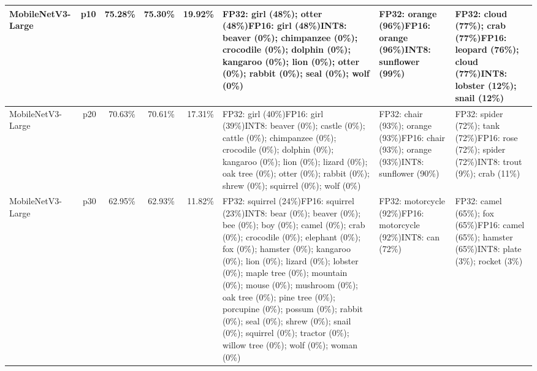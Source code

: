 \begin{longtable}{p{2.8cm} r r r r p{5.0cm} p{4.2cm} p{4.2cm}}
MobileNetV3-Large & p10 & 75.28\% & 75.30\% & 19.92\% & FP32: girl (48\%); otter (48\%)\newline FP16: girl (48\%)\newline INT8: beaver (0\%); chimpanzee (0\%); crocodile (0\%); dolphin (0\%); kangaroo (0\%); lion (0\%); otter (0\%); rabbit (0\%); seal (0\%); wolf (0\%) & FP32: orange (96\%)\newline FP16: orange (96\%)\newline INT8: sunflower (99\%) & FP32: cloud (77\%); crab (77\%)\newline FP16: leopard (76\%); cloud (77\%)\newline INT8: lobster (12\%); snail (12\%) \\ \hline
MobileNetV3-Large & p20 & 70.63\% & 70.61\% & 17.31\% & FP32: girl (40\%)\newline FP16: girl (39\%)\newline INT8: beaver (0\%); castle (0\%); cattle (0\%); chimpanzee (0\%); crocodile (0\%); dolphin (0\%); kangaroo (0\%); lion (0\%); lizard (0\%); oak tree (0\%); otter (0\%); rabbit (0\%); shrew (0\%); squirrel (0\%); wolf (0\%) & FP32: chair (93\%); orange (93\%)\newline FP16: chair (93\%); orange (93\%)\newline INT8: sunflower (90\%) & FP32: spider (72\%); tank (72\%)\newline FP16: rose (72\%); spider (72\%)\newline INT8: trout (9\%); crab (11\%) \\ \hline
MobileNetV3-Large & p30 & 62.95\% & 62.93\% & 11.82\% & FP32: squirrel (24\%)\newline FP16: squirrel (23\%)\newline INT8: bear (0\%); beaver (0\%); bee (0\%); boy (0\%); camel (0\%); crab (0\%); crocodile (0\%); elephant (0\%); fox (0\%); hamster (0\%); kangaroo (0\%); lion (0\%); lizard (0\%); lobster (0\%); maple tree (0\%); mountain (0\%); mouse (0\%); mushroom (0\%); oak tree (0\%); pine tree (0\%); porcupine (0\%); possum (0\%); rabbit (0\%); seal (0\%); shrew (0\%); snail (0\%); squirrel (0\%); tractor (0\%); willow tree (0\%); wolf (0\%); woman (0\%) & FP32: motorcycle (92\%)\newline FP16: motorcycle (92\%)\newline INT8: can (72\%) & FP32: camel (65\%); fox (65\%)\newline FP16: camel (65\%); hamster (65\%)\newline INT8: plate (3\%); rocket (3\%) \\ \hline

\end{longtable}
